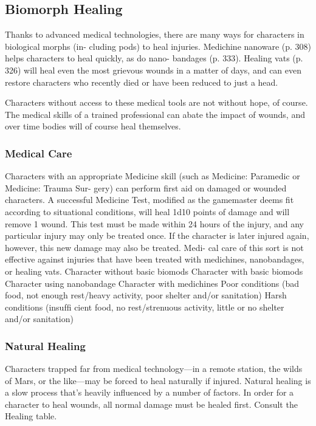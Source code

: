 \subsection{Biomorph Healing}

Thanks to advanced medical technologies, there are 
many ways for characters in biological morphs (in-
cluding pods) to heal injuries. Medichine nanoware 
(p. 308) helps characters to heal quickly, as do nano-
bandages (p. 333). Healing vats (p. 326) will heal even 
the most grievous wounds in a matter of days, and 
can even restore characters who recently died or have 
been reduced to just a head.

Characters without access to these medical tools are 
not without hope, of course. The medical skills of a 
trained professional can abate the impact of wounds, 
and over time bodies will of course heal themselves.

\subsubsection{Medical Care}

Characters with an appropriate Medicine skill (such 
as Medicine: Paramedic or Medicine: Trauma Sur-
gery) can perform first aid on damaged or wounded 
characters. A successful Medicine Test, modified as 
the gamemaster deems fit according to situational 
conditions, will heal 1d10 points of damage and will 
remove 1 wound. This test must be made within 24 
hours of the injury, and any particular injury may only 
be treated once. If the character is later injured again, 
however, this new damage may also be treated. Medi-
cal care of this sort is not effective against injuries that 
have been treated with medichines, nanobandages, or 
healing vats.
Character without basic biomods
Character with basic biomods
Character using nanobandage
Character with medichines
Poor conditions (bad food, not enough rest/heavy activity, 
poor shelter and/or sanitation)
Harsh conditions (insufﬁ cient food, no rest/strenuous activity, 
little or no shelter and/or sanitation)

\subsubsection{Natural Healing}

Characters trapped far from medical technology—in 
a remote station, the wilds of Mars, or the like—may 
be forced to heal naturally if injured. Natural healing 
is a slow process that's heavily influenced by a number 
of factors. In order for a character to heal wounds, 
all normal damage must be healed first. Consult the 
Healing table.

